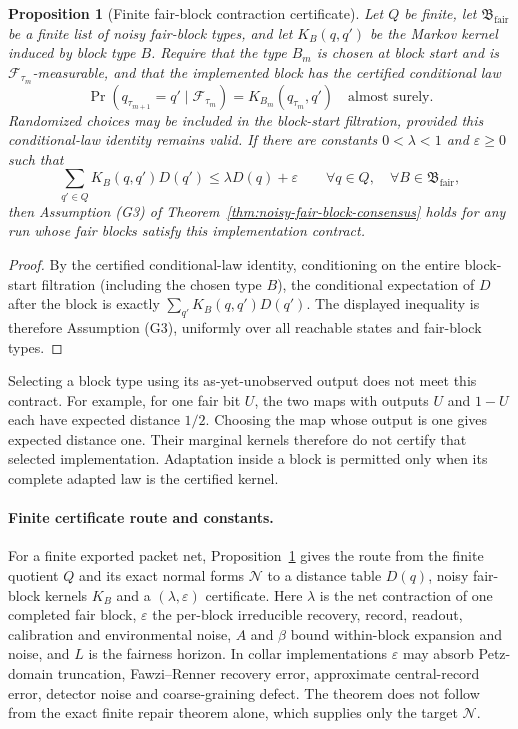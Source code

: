 \documentclass[11pt]{article}
\newtheorem{proposition}[theorem]{Proposition}
\theoremstyle{remark}
\theoremstyle{plain}
\begin{document}
\begin{proposition}[Finite fair-block contraction certificate]
\label{prop:finite-fair-block-certificate}
Let \(Q\) be finite, let \(\mathfrak B_{\mathrm{fair}}\) be a finite list of noisy fair-block
types, and let \(K_B(q,q')\) be the Markov kernel induced by block type \(B\).
Require that the type \(B_m\) is chosen at block start and is
\(\mathcal F_{\tau_m}\)-measurable, and that the implemented block has the
certified conditional law
\[
 \Pr(q_{\tau_{m+1}}=q'\mid\mathcal F_{\tau_m})
 =K_{B_m}(q_{\tau_m},q')
 \quad\text{almost surely}.
\]
Randomized choices may be included in the block-start filtration, provided
this conditional-law identity remains valid. If there are
constants \(0<\lambda<1\) and \(\varepsilon\ge0\) such that
\[
\sum_{q'\in Q}K_B(q,q')D(q')
\le
\lambda D(q)+\varepsilon
\qquad
\forall q\in Q,\quad \forall B\in\mathfrak B_{\mathrm{fair}},
\]
then Assumption (G3) of Theorem~\ref{thm:noisy-fair-block-consensus} holds for any run whose
fair blocks satisfy this implementation contract.
\end{proposition}

\begin{proof}
By the certified conditional-law identity, conditioning on the entire
block-start filtration (including the chosen type \(B\)), the
conditional expectation of \(D\) after the block is exactly
\(\sum_{q'}K_B(q,q')D(q')\). The displayed inequality is therefore Assumption (G3), uniformly
over all reachable states and fair-block types.
\end{proof}

Selecting a block type using its as-yet-unobserved output does not meet this
contract. For example, for one fair bit \(U\), the two maps with outputs
\(U\) and \(1-U\) each have expected distance \(1/2\). Choosing the map
whose output is one gives expected distance one. Their marginal kernels
therefore do not certify that selected implementation. Adaptation inside a
block is permitted only when its complete adapted law is the certified
kernel.

\paragraph{Finite certificate route and constants.}
For a finite exported packet net,
Proposition~\ref{prop:finite-fair-block-certificate} gives the route from
the finite quotient \(Q\) and its exact normal forms \(\mathcal N\) to a
distance table \(D(q)\), noisy fair-block kernels \(K_B\) and a
\((\lambda,\varepsilon)\) certificate. Here \(\lambda\) is the net
contraction of one completed fair block, \(\varepsilon\) the per-block
irreducible recovery, record, readout, calibration and environmental noise,
\(A\) and \(\beta\) bound within-block expansion and noise, and \(L\) is the
fairness horizon. In collar implementations \(\varepsilon\) may absorb
Petz-domain truncation, Fawzi--Renner recovery error, approximate
central-record error, detector noise and coarse-graining defect. The
theorem does not follow from the exact finite repair theorem alone, which
supplies only the target \(\mathcal N\).
\end{document}
